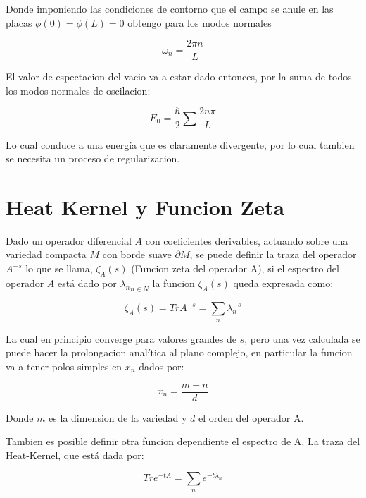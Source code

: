 Donde imponiendo las condiciones de contorno que el campo se anule en las placas $\phi (0) = \phi (L) = 0$ obtengo para los modos normales

\begin{equation}
\omega _n = \frac{2 \pi n}{L}
\end{equation}

El valor de espectacion del vacio va a estar dado entonces, por la suma de todos los modos normales de oscilacion:

\begin{equation}
E _0 = \frac{\hbar}{2} \sum \frac{2 n \pi}{L} 
\end{equation}

Lo cual conduce a una energía que es claramente divergente, por lo cual tambien se necesita un proceso de regularizacion.

\section{Heat Kernel y Funcion Zeta}

Dado un operador diferencial $A$ con coeficientes derivables, actuando sobre una variedad compacta $M$ con borde suave $\partial M$, se puede definir la traza del operador $A ^{-s}$ lo que se llama, $\zeta _A (s)$ (Funcion zeta del operador A), si el espectro del operador $A$ está dado por ${\lambda _n} _{n \in N}$ la funcion $\zeta _A (s)$ queda expresada como:


\begin{equation}
\zeta _A (s) = Tr A ^{-s} = \sum _{n}  \lambda _n ^{-s}
\end{equation}

La cual en principio converge para valores grandes de $s$, pero una vez calculada se puede hacer la prolongacion analítica al plano complejo, en particular la funcion va a tener polos simples en $x _n$ dados por:

\begin{equation}
x _n = \frac{m-n}{d} 
\end{equation}

Donde $m$ es la dimension de la variedad y $d$ el orden del operador A.

Tambien es posible definir otra funcion dependiente el espectro de A, La traza del Heat-Kernel, que está dada por:

\begin{equation}
Tr e ^{-t A} = 
\sum _{n} e ^{-t \lambda _n}
\end{equation}

